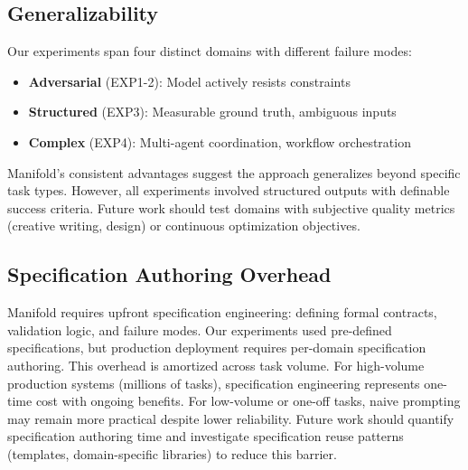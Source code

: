 \documentclass{article}
\begin{document}
\subsection{Generalizability}
Our experiments span four distinct domains with different failure modes:
\begin{itemize}
\item \textbf{Adversarial} (EXP1-2): Model actively resists constraints
\item \textbf{Structured} (EXP3): Measurable ground truth, ambiguous inputs
\item \textbf{Complex} (EXP4): Multi-agent coordination, workflow orchestration
\end{itemize}
Manifold's consistent advantages suggest the approach generalizes beyond specific task types. However, all experiments involved structured outputs with definable success criteria. Future work should test domains with subjective quality metrics (creative writing, design) or continuous optimization objectives.

\subsection{Specification Authoring Overhead}
Manifold requires upfront specification engineering: defining formal contracts, validation logic, and failure modes. Our experiments used pre-defined specifications, but production deployment requires per-domain specification authoring.
This overhead is amortized across task volume. For high-volume production systems (millions of tasks), specification engineering represents one-time cost with ongoing benefits. For low-volume or one-off tasks, naive prompting may remain more practical despite lower reliability.
Future work should quantify specification authoring time and investigate specification reuse patterns (templates, domain-specific libraries) to reduce this barrier.

\end{document}
